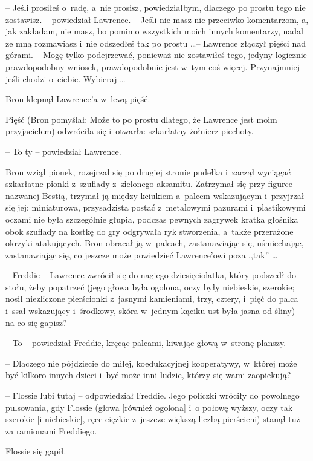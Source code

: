 \documentclass[oneside,polish,11pt,rmheadings]{mwbk}
\begin{document}
-- Jeśli prosiłeś o~radę, a~nie prosisz, powiedziałbym, dlaczego po prostu tego nie zostawisz. -- powiedział Lawrence. -- Jeśli nie masz nic przeciwko komentarzom, a, jak zakładam, nie masz, bo pomimo wszystkich moich innych komentarzy, nadal ze mną rozmawiasz i~nie odszedłeś tak po prostu \ldots  -- Lawrence złączył pięści nad górami. -- Mogę tylko podejrzewać, ponieważ nie zostawiłeś tego, jedyny logicznie prawdopodobny wniosek, prawdopodobnie jest w~tym coś więcej. Przynajmniej jeśli chodzi o~ciebie. Wybieraj \ldots  

Bron klepnął Lawrence'a w~lewą pięść. 

Pięść (Bron pomyślał: Może to po prostu dlatego, że Lawrence jest moim przyjacielem) odwróciła się i~otwarła: szkarłatny żołnierz piechoty. 

-- To ty -- powiedział Lawrence. 

Bron wziął pionek, rozejrzał się po drugiej stronie pudełka i~zaczął wyciągać szkarłatne pionki z~szuflady z~zielonego aksamitu. Zatrzymał się przy figurce nazwanej Bestią, trzymał ją między kciukiem a~palcem wskazującym i~przyjrzał się jej: miniaturowa, przysadzista postać z~metalowymi pazurami i~plastikowymi oczami nie była szczególnie głupia, podczas pewnych zagrywek kratka głośnika obok szuflady na kostkę do gry odgrywała ryk stworzenia, a~także przerażone okrzyki atakujących. Bron obracał ją w~palcach, zastanawiając się, uśmiechając, zastanawiając się, co jeszcze może powiedzieć Lawrence'owi poza ,,tak'' \ldots  

-- Freddie -- Lawrence zwrócił się do nagiego dziesięciolatka, który podszedł do stołu, żeby popatrzeć (jego głowa była ogolona, oczy były niebieskie, szerokie; nosił niezliczone pierścionki z~jasnymi kamieniami, trzy, cztery, i~pięć do palca i~ssał wskazujący i~środkowy, skóra w~jednym kąciku ust była jasna od śliny) -- na co się gapisz? 

-- To -- powiedział Freddie, kręcąc palcami, kiwając głową w~stronę planszy. 

-- Dlaczego nie pójdziecie do miłej, koedukacyjnej kooperatywy, w~której może być kilkoro innych dzieci i~być może inni ludzie, którzy się wami zaopiekują? 

-- Flossie lubi tutaj -- odpowiedział Freddie. Jego policzki wróciły do powolnego pulsowania, gdy Flossie (głowa [również ogolona] i~o połowę wyższy, oczy tak szerokie [i niebieskie], ręce ciężkie z~jeszcze większą liczbą pierścieni) stanął tuż za ramionami Freddiego. 

Flossie się gapił. 
\end{document}
